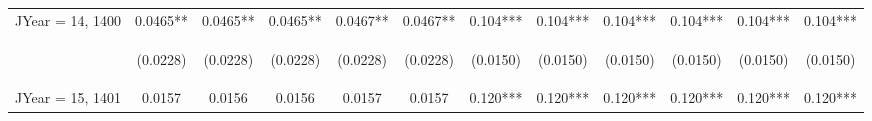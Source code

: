 \documentclass[]{article}
\begin{document}
\begin{center}
\begin{tabular}{lccccccccccc}
JYear = 14, 1400 & 0.0465** & 0.0465** & 0.0465** & 0.0467** & 0.0467** & 0.104*** & 0.104*** & 0.104*** & 0.104*** & 0.104*** & 0.104*** \\
\vspace{4pt} & \begin{footnotesize}(0.0228)\end{footnotesize} & \begin{footnotesize}(0.0228)\end{footnotesize} & \begin{footnotesize}(0.0228)\end{footnotesize} & \begin{footnotesize}(0.0228)\end{footnotesize} & \begin{footnotesize}(0.0228)\end{footnotesize} & \begin{footnotesize}(0.0150)\end{footnotesize} & \begin{footnotesize}(0.0150)\end{footnotesize} & \begin{footnotesize}(0.0150)\end{footnotesize} & \begin{footnotesize}(0.0150)\end{footnotesize} & \begin{footnotesize}(0.0150)\end{footnotesize} & \begin{footnotesize}(0.0150)\end{footnotesize} \\
JYear = 15, 1401 & 0.0157 & 0.0156 & 0.0156 & 0.0157 & 0.0157 & 0.120*** & 0.120*** & 0.120*** & 0.120*** & 0.120*** & 0.120*** \\

\end{tabular}
\end{center}
\end{document}
